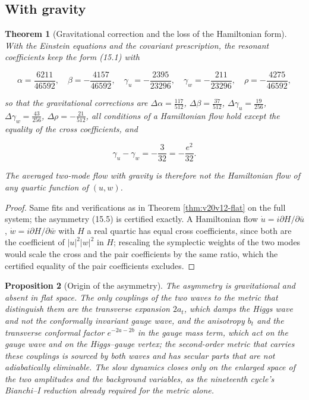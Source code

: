 \documentclass[11pt]{article}
\newtheorem{theorem}{Theorem}[section]
\newtheorem{proposition}[theorem]{Proposition}
\theoremstyle{remark}
\begin{document}
\subsection{With gravity}

\begin{theorem}[Gravitational correction and the loss of the Hamiltonian form]
\label{thm:v20v12-gravity}
With the Einstein equations and the covariant prescription, the
resonant coefficients keep the form (15.1) with

\[
 \alpha=\frac{6211}{46592},\quad\beta=-\frac{4157}{46592},\quad
 \gamma_u=-\frac{2395}{23296},\quad\gamma_w=-\frac{211}{23296},\quad
 \rho=-\frac{4275}{46592},                                            \tag{15.4}
\]

so that the gravitational corrections are
\(\Delta\alpha=\tfrac{117}{512}\), \(\Delta\beta=\tfrac{37}{512}\),
\(\Delta\gamma_u=\tfrac{19}{256}\), \(\Delta\gamma_w=\tfrac{43}{256}\),
\(\Delta\rho=-\tfrac{21}{512}\), all conditions of a Hamiltonian flow
hold except the equality of the cross coefficients, and

\[
 \gamma_u-\gamma_w=-\frac3{32}=-\frac{e^2}{32}.                         \tag{15.5}
\]

The averaged two-mode flow with gravity is therefore not the
Hamiltonian flow of any quartic function of \((u,w)\).
\end{theorem}

\begin{proof}
Same fits and verifications as in Theorem \ref{thm:v20v12-flat} on
the full system; the asymmetry (15.5) is certified exactly.  A
Hamiltonian flow \(\dot u=i\partial H/\partial\bar u\), \(\dot w=i\partial H/\partial\bar w\)
with \(H\) a real quartic has equal cross coefficients, since both are
the coefficient of \(|u|^2|w|^2\) in \(H\); rescaling the symplectic
weights of the two modes would scale the cross and the pair
coefficients by the same ratio, which the certified equality of the
pair coefficients excludes.
\end{proof}

\begin{proposition}[Origin of the asymmetry]
\label{prop:v20v12-origin}
The asymmetry is gravitational and absent in flat space.  The only
couplings of the two waves to the metric that distinguish them are
the transverse expansion \(2a_t\), which damps the Higgs wave and not
the conformally invariant gauge wave, and the anisotropy \(b_t\) and
the transverse conformal factor \(e^{-2a-2b}\) in the gauge mass term,
which act on the gauge wave and on the Higgs--gauge vertex; the
second-order metric that carries these couplings is sourced by both
waves and has secular parts that are not adiabatically eliminable.
The slow dynamics closes only on the enlarged space of the two
amplitudes and the background variables, as the nineteenth cycle's
Bianchi--I reduction already required for the metric alone.
\end{proposition}
\end{document}
